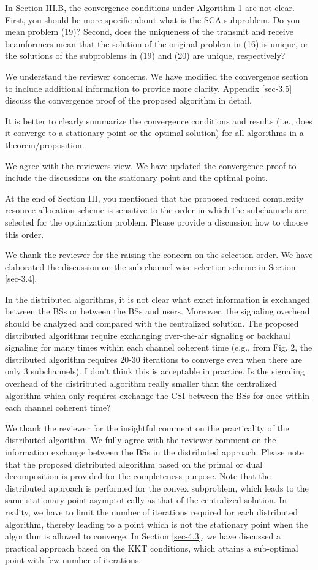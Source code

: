  In Section III.B, the convergence conditions under Algorithm 1 are not clear. First, you should be more specific about what is the SCA subproblem. Do you mean problem (19)? Second, does the uniqueness of the transmit and receive beamformers mean that the solution of the original problem in (16) is unique, or the solutions of the subproblems in (19) and (20) are unique, respectively?

\resp We understand the reviewer concerns. We have modified the convergence section to include additional information to provide more clarity. Appendix \ref{sec-3.5} discuss the convergence proof of the proposed algorithm in detail.

 It is better to clearly summarize the convergence conditions and results (i.e., does it converge to a stationary point or the optimal solution) for all algorithms in a theorem/proposition.

\resp We agree with the reviewers view. We have updated the convergence proof to include the discussions on the stationary point and the optimal point.

 At the end of Section III, you mentioned that the proposed reduced complexity resource allocation scheme is sensitive to the order in which the subchannels are selected for the optimization problem. Please provide a discussion how to choose this order.

\resp We thank the reviewer for the raising the concern on the selection order. We have elaborated the discussion on the sub-channel wise selection scheme in Section \ref{sec-3.4}. 

 In the distributed algorithms, it is not clear what exact information is exchanged between the BSs or between the BSs and users. Moreover, the signaling overhead should be analyzed and compared with the centralized solution. The proposed distributed algorithms require exchanging over-the-air signaling or backhaul signaling for many times within each channel coherent time (e.g., from Fig. 2, the distributed algorithm requires 20-30 iterations to converge even when there are only 3 subchannels). I don’t think this is acceptable in practice. Is the signaling overhead of the distributed algorithm really smaller than the centralized algorithm which only requires exchange the CSI between the BSs for once within each channel coherent time?

\resp We thank the reviewer for the insightful comment on the practicality of the distributed algorithm. We fully agree with the reviewer comment on the information exchange between the BSs in the distributed approach. Please note that the proposed distributed algorithm based on the primal or dual decomposition is provided for the completeness purpose. Note that the distributed approach is performed for the convex subproblem, which leads to the same stationary point asymptotically as that of the centralized solution. In reality, we have to limit the number of iterations required for each distributed algorithm, thereby leading to a point which is not the stationary point when the algorithm is allowed to converge. In Section \ref{sec-4.3}, we have discussed a practical approach based on the KKT conditions, which attains a sub-optimal point with few number of iterations.


